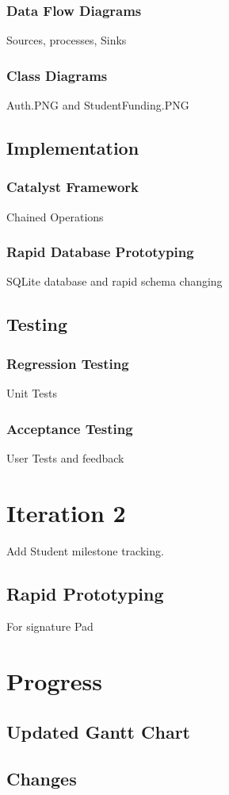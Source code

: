 \documentclass{journal}
\begin{document}
\subsubsection{Data Flow Diagrams}
Sources, processes, Sinks
\subsubsection{Class Diagrams}
Auth.PNG and StudentFunding.PNG
\subsection{Implementation}
\subsubsection{Catalyst Framework}
Chained Operations
\subsubsection{Rapid Database Prototyping}
SQLite database and rapid schema changing
\subsection{Testing}
\subsubsection{Regression Testing}
Unit Tests
\subsubsection{Acceptance Testing}
User Tests and feedback

\section{Iteration 2}
Add Student milestone tracking.
\subsection{Rapid Prototyping}
For signature Pad
\section{Progress}
\subsection{Updated Gantt Chart}
\subsection{Changes}

\end{document}
